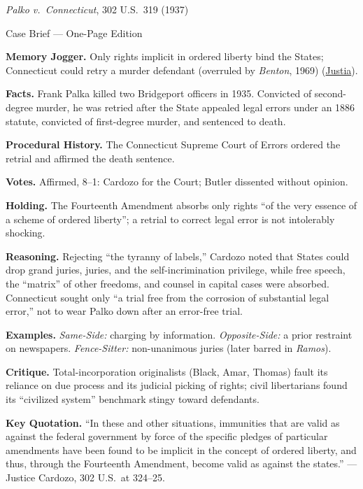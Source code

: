 \documentclass[12pt]{article}
\begin{document}
\begin{center}
{\Large \textit{Palko v.\ Connecticut}, 302 U.S.\ 319 (1937)\par}
\vspace{0.3em}
{\normalsize Case Brief --- One-Page Edition\par}
\end{center}

\textbf{Memory Jogger.} Only rights implicit in ordered liberty bind the States; Connecticut could retry a murder defendant (overruled by \textit{Benton}, 1969) (\href{https://supreme.justia.com/cases/federal/us/302/319/}{Justia}).

\textbf{Facts.} Frank Palka killed two Bridgeport officers in 1935. Convicted of second-degree murder, he was retried after the State appealed legal errors under an 1886 statute, convicted of first-degree murder, and sentenced to death.

\textbf{Procedural History.} The Connecticut Supreme Court of Errors ordered the retrial and affirmed the death sentence.

\textbf{Votes.} Affirmed, 8--1: Cardozo for the Court; Butler dissented without opinion.

\textbf{Holding.} The Fourteenth Amendment absorbs only rights ``of the very essence of a scheme of ordered liberty''; a retrial to correct legal error is not intolerably shocking.

\textbf{Reasoning.} Rejecting ``the tyranny of labels,'' Cardozo noted that States could drop grand juries, juries, and the self-incrimination privilege, while free speech, the ``matrix'' of other freedoms, and counsel in capital cases were absorbed. Connecticut sought only ``a trial free from the corrosion of substantial legal error,'' not to wear Palko down after an error-free trial.

\textbf{Examples.} \emph{Same-Side:} charging by information. \emph{Opposite-Side:} a prior restraint on newspapers. \emph{Fence-Sitter:} non-unanimous juries (later barred in \textit{Ramos}).

\textbf{Critique.} Total-incorporation originalists (Black, Amar, Thomas) fault its reliance on due process and its judicial picking of rights; civil libertarians found its ``civilized system'' benchmark stingy toward defendants.

\textbf{Key Quotation.} ``In these and other situations, immunities that are valid as against the federal government by force of the specific pledges of particular amendments have been found to be implicit in the concept of ordered liberty, and thus, through the Fourteenth Amendment, become valid as against the states.'' --- Justice Cardozo, 302 U.S.\ at 324--25.
\end{document}
